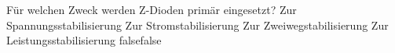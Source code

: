     {Für welchen Zweck werden Z-Dioden primär eingesetzt?}
    {Zur Spannungsstabilisierung}
    {Zur Stromstabilisierung}
    {Zur Zweiwegstabilisierung}
    {Zur Leistungsstabilisierung}
    {false}{false}